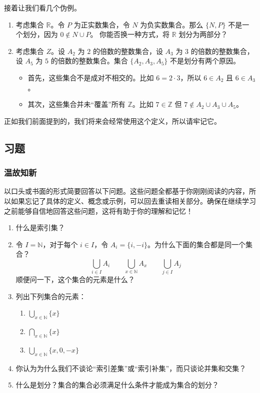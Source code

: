 \begin{example}
    接着让我们看几个伪例。
    \begin{enumerate}[label=(\arabic*)]
        \item 考虑集合 $\mathbb{R}$。令 $P$ 为正实数集合，令 $N$ 为负实数集合。那么 $\{N, P\}$ 不是一个划分，因为 $0 \notin N \cup P$。
        你能否换一种方式，将 $\mathbb{R}$ 划分为两部分？
        \item 考虑集合 $Z$。设 $A_2$ 为 $2$ 的倍数的整数集合，设 $A_3$ 为 $3$ 的倍数的整数集合，设 $A_5$ 为 $5$ 的倍数的整数集合。集合 $\{A_2, A_3, A_5\}$ 不是划分有两个原因。
        \begin{itemize}
            \item 首先，这些集合不是成对不相交的。比如 $6=2 \cdot 3$，所以 $6 \in A_2$ 且 $6 \in A_3$。
            \item 其次，这些集合并未``覆盖''所有 $\mathbb{Z}$。比如 $7 \in \mathbb{Z}$ 但 $7 \notin A_2 \cup A_3 \cup A_5$。
        \end{itemize}
    \end{enumerate}
\end{example}

正如我们前面提到的，我们将来会经常使用这个定义，所以请牢记它。

\subsection{习题}

\subsubsection*{温故知新}

以口头或书面的形式简要回答以下问题。这些问题全都基于你刚刚阅读的内容，所以如果忘记了具体的定义、概念或示例，可以回去重读相关部分。确保在继续学习之前能够自信地回答这些问题，这将有助于你的理解和记忆！

\begin{enumerate}[label=(\arabic*)]
    \item 什么是索引集？
    \item 令 $I = \mathbb{N}$，对于每个 $i \in I$，令 $A_i = \{i, -i\}$。为什么下面的集合都是同一个集合？
    \[\bigcup_{i \in I} A_i \qquad \bigcup_{x \in \mathbb{N}} A_x \qquad \bigcup_{j \in I} A_j\]
    顺便问一下，这个集合的元素是什么？
    \item 列出下列集合的元素：
    \begin{enumerate}[label=(\alph*)]
        \item $\displaystyle{\bigcup_{x \in \mathbb{N}}\{x\}}$
        \item $\displaystyle{\bigcap_{x \in \mathbb{N}}\{x\}}$
        \item $\displaystyle{\bigcup_{x \in \mathbb{N}}\{x,0,-x\}}$
    \end{enumerate}
    \item 你认为为什么我们不谈论``索引差集''或``索引补集''，而只谈论并集和交集？
    \item 什么是划分？集合的集合必须满足什么条件才能成为集合的划分？
\end{enumerate}

